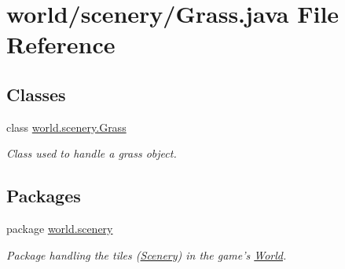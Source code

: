 \hypertarget{a00065}{\section{world/scenery/\-Grass.java File Reference}
\label{a00065}
}
\subsection*{Classes}
\begin{DoxyCompactItemize}
\item 
class \hyperlink{a00011}{world.\-scenery.\-Grass}
\begin{DoxyCompactList}\small\item\em Class used to handle a grass object. \end{DoxyCompactList}\end{DoxyCompactItemize}
\subsection*{Packages}
\begin{DoxyCompactItemize}
\item 
package \hyperlink{a00091}{world.\-scenery}
\begin{DoxyCompactList}\small\item\em Package handling the tiles (\hyperlink{a00024}{Scenery}) in the game's \hyperlink{a00039}{World}. \end{DoxyCompactList}\end{DoxyCompactItemize}
